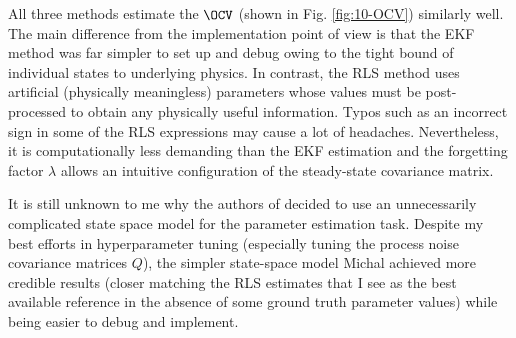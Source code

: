 All three methods estimate the $\OCV$ (shown in Fig. \ref{fig:10-OCV}) similarly well. The main difference from the implementation point of view is that the EKF method was far simpler to set up and debug owing to the tight bound of individual states to underlying physics. In contrast, the RLS method uses artificial (physically meaningless) parameters whose values must be post-processed to obtain any physically useful information. Typos such as an incorrect sign in some of the RLS expressions may cause a lot of headaches. Nevertheless, it is computationally less demanding than the EKF estimation and the forgetting factor $\lambda$ allows an intuitive configuration of the steady-state covariance matrix.

It is still unknown to me why the authors of \cite{hongwen} decided to use an unnecessarily complicated state space model for the parameter estimation task. Despite my best efforts in hyperparameter tuning (especially tuning the process noise covariance matrices $Q$), the simpler state-space model Michal achieved more credible results (closer matching the RLS estimates that I see as the best available reference in the absence of some ground truth parameter values) while being easier to debug and implement.

